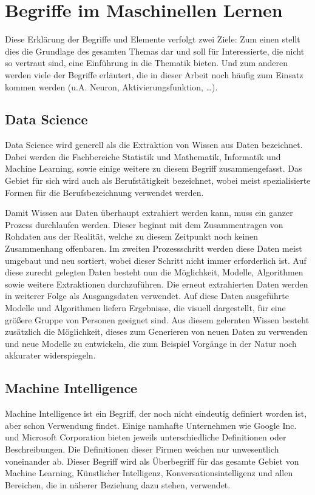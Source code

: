 \chapter{Begriffe im Maschinellen Lernen}
\label{cha:Begriffe}

Diese Erklärung der Begriffe und Elemente verfolgt zwei Ziele: 
Zum einen stellt dies die Grundlage des gesamten Themas dar und soll für Interessierte, die nicht so vertraut sind, eine Einführung in die Thematik bieten. 
Und zum anderen werden viele der Begriffe erläutert, die in dieser Arbeit noch häufig zum Einsatz kommen werden (u.A. Neuron, Aktivierungsfunktion, …).

\section{Data Science}

Data Science wird generell als die Extraktion von Wissen aus Daten bezeichnet. 
Dabei werden die Fachbereiche Statistik und Mathematik, Informatik und Machine Learning, sowie einige weitere zu diesem Begriff zusammengefasst. 
Das Gebiet für sich wird auch als Berufstätigkeit bezeichnet, wobei meist spezialisierte Formen für die Berufsbezeichnung verwendet werden. \newline

\noindent 
Damit Wissen aus Daten überhaupt extrahiert werden kann, muss ein ganzer Prozess durchlaufen werden. 
Dieser beginnt mit dem Zusammentragen von Rohdaten aus der Realität, welche zu diesem Zeitpunkt noch keinen Zusammenhang offenbaren. 
Im zweiten Prozessschritt werden diese Daten meist umgebaut und neu sortiert, wobei dieser Schritt nicht immer erforderlich ist. 
Auf diese zurecht gelegten Daten besteht nun die Möglichkeit, Modelle, Algorithmen sowie weitere Extraktionen durchzuführen. 
Die erneut extrahierten Daten werden in weiterer Folge als Ausgangsdaten verwendet. 
Auf diese Daten ausgeführte Modelle und Algorithmen liefern Ergebnisse, die visuell dargestellt, für eine größere Gruppe von Personen geeignet sind. 
Aus diesem gelernten Wissen besteht zusätzlich die Möglichkeit, dieses zum Generieren von neuen Daten zu verwenden und neue Modelle zu entwickeln, die zum Beispiel Vorgänge in der Natur noch akkurater widerspiegeln.

\section{Machine Intelligence}

Machine Intelligence ist ein Begriff, der noch nicht eindeutig definiert worden ist, aber schon Verwendung findet. 
Einige namhafte Unternehmen wie Google Inc. und Microsoft Corporation bieten jeweils unterschiedliche Definitionen oder Beschreibungen. 
Die Definitionen dieser Firmen weichen nur unwesentlich voneinander ab.
Dieser Begriff wird als Überbegriff für das gesamte Gebiet von Machine Learning, Künstlicher Intelligenz, Konversationsintelligenz und allen Bereichen, die in näherer Beziehung dazu stehen, verwendet. 

